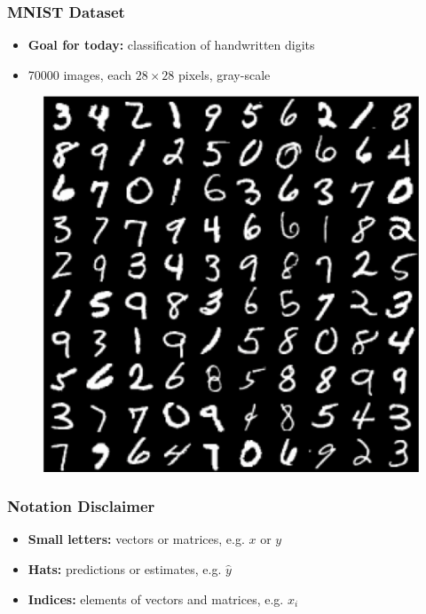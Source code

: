 \documentclass[aspectratio=1610]{beamer}
\begin{document}
\begin{frame}
\frametitle{MNIST Dataset}

\begin{itemize}
\item \textbf{Goal for today:} classification of handwritten digits
\item 70000 images, each $28\times 28$ pixels, gray-scale
\end{itemize}

\begin{figure}
\includegraphics[height=0.6\textheight]{mnist.png}
\end{figure}
\end{frame}

\begin{frame}
\frametitle{Notation Disclaimer}
\begin{itemize}
    \item \textbf{Small letters:} vectors or matrices, e.g. $x$ or $y$
    \item \textbf{Hats:} predictions or estimates, e.g. $\hat{y}$
    \item \textbf{Indices:} elements of vectors and matrices, e.g. $x_{i}$
\end{itemize}

\medskip
\end{frame}
\end{document}
